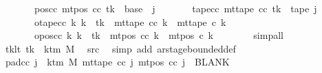 \begin{isabellebody}
\ \ \ \ \ \ \ pos{\isacharunderscore}{\kern0pt}cc{\isacharcolon}{\kern0pt}\ {\isachardoublequoteopen}mt{\isacharunderscore}{\kern0pt}pos\ cc\ tk\ {\isacharequal}{\kern0pt}\ base\ {\isacharplus}{\kern0pt}\ j{\isachardoublequoteclose}\isanewline
\ \ \ \ \ \ \ tape{\isacharunderscore}{\kern0pt}cc{\isacharcolon}{\kern0pt}\ {\isachardoublequoteopen}mt{\isacharunderscore}{\kern0pt}tape\ cc\ tk\ {\isacharequal}{\kern0pt}\ {\isacharquery}{\kern0pt}tape\ j{\isachardoublequoteclose}\isanewline
\ \ \ \ \ \ \ otape{\isacharunderscore}{\kern0pt}cc{\isacharcolon}{\kern0pt}\ {\isachardoublequoteopen}{\isasymforall}k{\isacharprime}{\kern0pt}{\isachardot}{\kern0pt}\ k{\isacharprime}{\kern0pt}\ {\isasymnoteq}\ tk\ {\isasymlongrightarrow}\ mt{\isacharunderscore}{\kern0pt}tape\ cc\ k{\isacharprime}{\kern0pt}\ {\isacharequal}{\kern0pt}\ mt{\isacharunderscore}{\kern0pt}tape\ c{}\ k{\isacharprime}{\kern0pt}{\isachardoublequoteclose}\isanewline
\ \ \ \ \ \ \ opos{\isacharunderscore}{\kern0pt}cc{\isacharcolon}{\kern0pt}\ {\isachardoublequoteopen}{\isasymforall}k{\isacharprime}{\kern0pt}{\isachardot}{\kern0pt}\ k{\isacharprime}{\kern0pt}\ {\isasymnoteq}\ tk\ {\isasymlongrightarrow}\ mt{\isacharunderscore}{\kern0pt}pos\ cc\ k{\isacharprime}{\kern0pt}\ {\isacharequal}{\kern0pt}\ mt{\isacharunderscore}{\kern0pt}pos\ c{}\ k{\isacharprime}{\kern0pt}{\isachardoublequoteclose}\isanewline
\ \ \ \ \ \ \isamarkupfalse%
\ simp{\isacharunderscore}{\kern0pt}all\isanewline
\ \ \ \ \isamarkupfalse%
\ tk{\isacharunderscore}{\kern0pt}lt{\isacharcolon}{\kern0pt}\ {\isachardoublequoteopen}tk\ {\isacharless}{\kern0pt}\ k{\isacharunderscore}{\kern0pt}tm\ M{\isachardoublequoteclose}\ \isamarkupfalse%
\ src{}\ \isamarkupfalse%
\ {\isacharparenleft}{\kern0pt}simp\ add{\isacharcolon}{\kern0pt}\ ar{\isacharunderscore}{\kern0pt}stage{\isacharunderscore}{\kern0pt}bounded{\isacharunderscore}{\kern0pt}def{\isacharparenright}{\kern0pt}\isanewline
\ \ \ \ \isamarkupfalse%
\ pad{\isacharunderscore}{\kern0pt}cc{\isacharcolon}{\kern0pt}\ {\isachardoublequoteopen}{\isasymforall}j{\isacharprime}{\kern0pt}\ {\isasymge}\ k{\isacharunderscore}{\kern0pt}tm\ M{\isachardot}{\kern0pt}\ mt{\isacharunderscore}{\kern0pt}tape\ cc\ j{\isacharprime}{\kern0pt}\ {\isacharparenleft}{\kern0pt}mt{\isacharunderscore}{\kern0pt}pos\ cc\ j{\isacharprime}{\kern0pt}{\isacharparenright}{\kern0pt}\ {\isacharequal}{\kern0pt}\ BLANK{}{\isachardoublequoteclose}\isanewline

\end{isabellebody}
